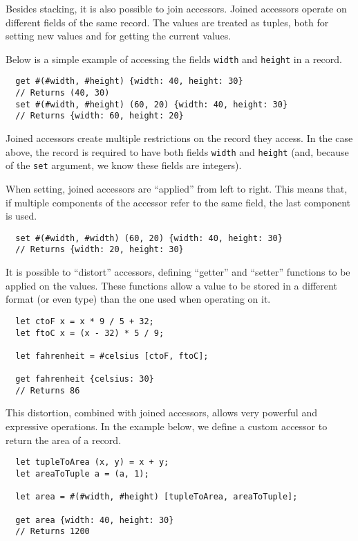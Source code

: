 \documentclass{article}
\begin{document}
\medskip

Besides stacking, it is also possible to join accessors.
Joined accessors operate on different fields of the same record.
The values are treated as tuples, both for setting new values and for getting the current values.

Below is a simple example of accessing the fields \texttt{width} and \texttt{height} in a record.

\begin{lstlisting}
  get #(#width, #height) {width: 40, height: 30}
  // Returns (40, 30)
  set #(#width, #height) (60, 20) {width: 40, height: 30}
  // Returns {width: 60, height: 20}
\end{lstlisting}

Joined accessors create multiple restrictions on the record they access.
In the case above, the record is required to have both fields \texttt{width} and \texttt{height} (and, because of the \texttt{set} argument, we know these fields are integers).

When setting, joined accessors are ``applied'' from left to right.
This means that, if multiple components of the accessor refer to the same field, the last component is used.

\begin{lstlisting}
  set #(#width, #width) (60, 20) {width: 40, height: 30}
  // Returns {width: 20, height: 30}
\end{lstlisting}

\medskip

It is possible to ``distort'' accessors, defining ``getter'' and ``setter'' functions to be applied on the values.
These functions allow a value to be stored in a different format (or even type) than the one used when operating on it.

\begin{lstlisting}
  let ctoF x = x * 9 / 5 + 32;
  let ftoC x = (x - 32) * 5 / 9;

  let fahrenheit = #celsius [ctoF, ftoC];

  get fahrenheit {celsius: 30}
  // Returns 86
\end{lstlisting}

This distortion, combined with joined accessors, allows very powerful and expressive operations.
In the example below, we define a custom accessor to return the area of a record.

\begin{lstlisting}
  let tupleToArea (x, y) = x + y;
  let areaToTuple a = (a, 1);

  let area = #(#width, #height) [tupleToArea, areaToTuple];

  get area {width: 40, height: 30}
  // Returns 1200
\end{lstlisting}
\end{document}
